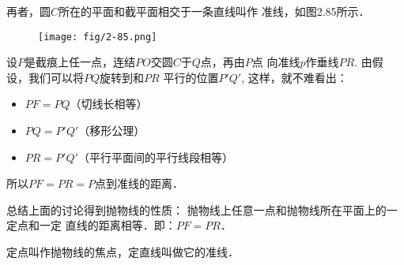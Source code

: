 再者，圆$C$所在的平面和截平面相交于一条直线叫作
准线，如图2.85所示．
\begin{figure}[htp]
    \centering
    \texttt{[image: fig/2-85.png]}
    \caption{}
\end{figure}

设$P$是截痕上任一点，连结$PO$交圆$C$于$Q$点，再由$P$点
向准线$p$作垂线$PR$. 由假设，我们可以将$PQ$旋转到和$PR$
平行的位置$P'Q'$, 这样，就不难看出：
\begin{itemize}
    \item $PF=PQ$（切线长相等）
    \item $PQ=P'Q'$（移形公理）
    \item $PR=P'Q'$（平行平面间的平行线段相等）
\end{itemize}

所以$PF=PR=P$点到准线的距离．

总结上面的讨论得到抛物线的性质：
抛物线上任意一点和抛物线所在平面上的一定点和一定
直线的距离相等．即：$PF=PR$．

定点叫作抛物线的焦点，定直线叫做它的准线．

